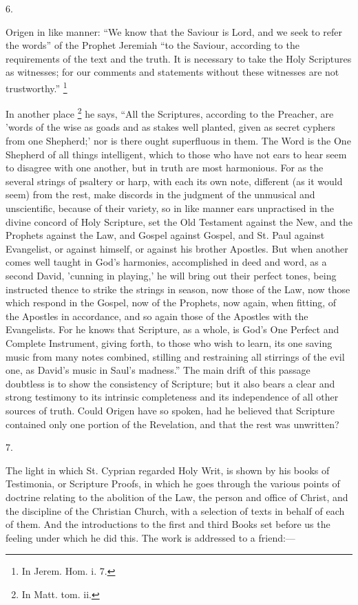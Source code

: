 6.

Origen in like manner: ``We know that the Saviour is Lord, and we seek to refer the words'' of the Prophet Jeremiah
``to the Saviour, according to the requirements of the text and
the truth. It is necessary to take the Holy Scriptures as witnesses;
for our comments and statements without these witnesses are not
trustworthy.'' \footnote{In Jerem. Hom. i. 7.}

In another place \footnote{In Matt. tom. ii.} he says, ``All the Scriptures,
according to the Preacher, are 'words of the wise as goads and as
stakes well planted, given as secret cyphers from one Shepherd;' nor
is there ought superfluous in them. The Word is the One Shepherd of
all things intelligent, which to those who have not ears to hear seem
to disagree with one another, but in truth are most harmonious. For as
the several strings of psaltery or harp, with each its own note,
different (as it would seem) from the rest, make discords in the
judgment of the unmusical and unscientific, because of their variety,
so in like manner ears unpractised in the divine concord of Holy
Scripture, set the Old Testament against the New, and the Prophets
against the Law, and Gospel against Gospel, and St. Paul against
Evangelist, or against himself, or against his brother Apostles. But
when another comes well taught in God's harmonies, accomplished in
deed and word, as a second David, 'cunning in playing,' he will bring
out their perfect tones, being instructed thence to strike the strings
in season, now those of the Law, now those which respond in the
Gospel, now of the Prophets, now again, when fitting, of the Apostles
in accordance, and so again those of the Apostles with the
Evangelists. For he knows that Scripture, as a whole, is God's One
Perfect and Complete Instrument, giving forth, to those who wish to
learn, its one saving music from many notes combined, stilling and
restraining all stirrings of the evil one, as David's music in Saul's
madness.'' The main drift of this passage doubtless is to show the
consistency of Scripture; but it also bears a clear and strong
testimony to its intrinsic completeness and its independence of all
other sources of truth. Could Origen have so spoken, had he believed
that Scripture contained only one portion of the Revelation, and that
the rest was unwritten?

7.

The light in which St. Cyprian regarded Holy Writ, is shown by his
books of Testimonia, or Scripture Proofs, in which he goes through the
various points of doctrine relating to the abolition of the Law, the
person and office of Christ, and the discipline of the Christian
Church, with a selection of texts in behalf of each of them. And the
introductions to the first and third Books set before us the feeling
under which he did this. The work is addressed to a friend:—

